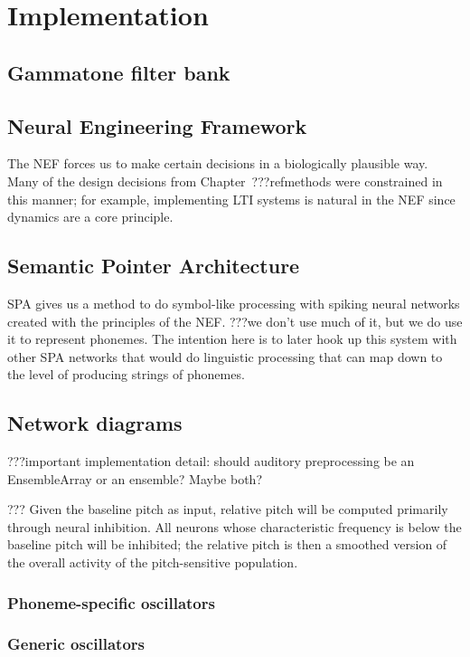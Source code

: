 \chapter{Implementation}



\section{Gammatone filter bank}

\section{Neural Engineering Framework}

The NEF forces us to make certain decisions
in a biologically plausible way.
Many of the design decisions from Chapter~???refmethods
were constrained in this manner;
for example, implementing LTI systems is natural
in the NEF since dynamics are a core principle.

\section{Semantic Pointer Architecture}

SPA gives us a method to do symbol-like processing
with spiking neural networks created
with the principles of the NEF.
???we don't use much of it,
but we do use it to represent phonemes.
The intention here is to later hook up
this system with other SPA networks
that would do linguistic processing
that can map down to the level of
producing strings of phonemes.

\section{Network diagrams}

???important implementation detail:
should auditory preprocessing be an EnsembleArray
or an ensemble? Maybe both?

??? Given the baseline pitch as input,
relative pitch will be computed
primarily through neural inhibition.
All neurons whose characteristic frequency is below
the baseline pitch will be inhibited;
the relative pitch is then
a smoothed version of the overall activity
of the pitch-sensitive population.

\subsection{Phoneme-specific oscillators}

\subsection{Generic oscillators}
